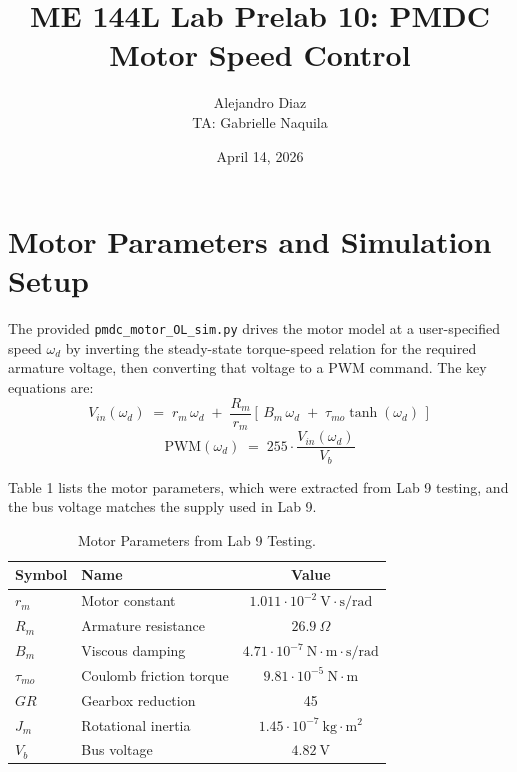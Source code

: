 \documentclass{article}
\title{\textbf{ME 144L Lab Prelab 10: PMDC Motor Speed Control}}
\author{Alejandro Diaz \\ TA: Gabrielle Naquila}
\date{April 14, 2026}
\begin{document}
\maketitle

\section{Motor Parameters and Simulation Setup}

The provided \texttt{pmdc\_motor\_OL\_sim.py} drives the motor model at a user-specified speed $\omega_d$ by inverting the steady-state torque-speed relation for the required armature voltage, then converting that voltage to a PWM command. The key equations are:
\begin{equation}
    V_{in}(\omega_d)
    \;=\; r_m\,\omega_d
    \;+\; \frac{R_m}{r_m}\!\left[\,B_m\,\omega_d \;+\; \tau_{mo}\tanh(\omega_d)\,\right]
    \label{eq:ol_vin}
\end{equation}
\begin{equation}
    \mathrm{PWM}(\omega_d) \;=\; 255 \cdot \frac{V_{in}(\omega_d)}{V_b}
    \label{eq:ol_pwm}
\end{equation}

\noindent Table 1 lists the motor parameters, which were extracted from Lab 9 testing, and the bus voltage matches the supply used in Lab 9.
\begin{table}[H]
    \centering
    \caption{Motor Parameters from Lab 9 Testing.}
    \label{tab:params}
    \begin{tabular}{llc}
        \toprule
        Symbol & Name & Value \\
        \midrule
        $r_m$      & Motor constant                 & $1.011\cdot 10^{-2}~\mathrm{V\!\cdot\!s/rad}$ \\
        $R_m$      & Armature resistance            & $26.9~\Omega$ \\
        $B_m$      & Viscous damping                & $4.71\cdot 10^{-7}~\mathrm{N\!\cdot\!m\!\cdot\!s/rad}$ \\
        $\tau_{mo}$& Coulomb friction torque        & $9.81\cdot 10^{-5}~\mathrm{N\!\cdot\!m}$ \\
        $GR$       & Gearbox reduction              & 45 \\
        $J_m$      & Rotational inertia  & $1.45\cdot 10^{-7}~\mathrm{kg\!\cdot\!m^2}$ \\
        $V_b$      & Bus voltage                    & $4.82~\mathrm{V}$ \\
        \bottomrule
    \end{tabular}
\end{table}
\end{document}
